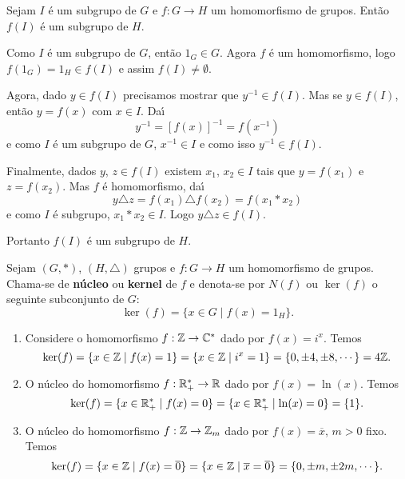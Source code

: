 \begin{proposicao}
    Sejam $I$ \'e um subgrupo de $G$ e $f : G \to H$ um homomorfismo de grupos. Ent\~ao $f(I)$ \'e um subgrupo de $H$.
\end{proposicao}
\begin{prova}
    Como $I$ \'e um subgrupo de $G$, ent\~ao $1_G \in G$. Agora $f$ \'e um homomorfismo, logo $f(1_G) = 1_H \in f(I)$ e assim $f(I) \ne \emptyset$.

    Agora, dado $y \in f(I)$ precisamos mostrar que $y^{-1} \in f(I)$. Mas se $y \in f(I)$, ent\~ao $y = f(x)$ com $x \in I$. Da{\'\i}
    \[
        y^{-1} = [f(x)]^{-1} = f(x^{-1})
    \]
    e como $I$ \'e um subgrupo de $G$, $x^{-1} \in I$ e como isso $y^{-1} \in f(I)$.

    Finalmente, dados $y$, $z \in f(I)$ existem $x_1$, $x_2 \in I$ tais que $y = f(x_1)$ e $z = f(x_2)$. Mas $f$ \'e homomorfismo, da{\'\i}
    \[
        y\triangle z = f(x_1)\triangle f(x_2) = f(x_1*x_2)
    \]
    e como $I$ \'e subgrupo, $x_1*x_2 \in I$. Logo $y\triangle z \in f(I)$.

    Portanto $f(I)$ \'e um subgrupo de $H$.
\end{prova}

\begin{definicao}
    Sejam $(G, *)$, $(H, \triangle)$ grupos e $f : G \to H$ um homomorfismo de grupos. Chama-se de \textbf{n\'ucleo} ou \textbf{kernel} de $f$ e denota-se por $N(f)$ ou $\ker(f)$ o seguinte subconjunto de $G$:
    \[
        \ker(f) = \{x \in G \mid f(x) = 1_H\}.
    \]
\end{definicao}

\begin{exemplos}
    \begin{enumerate}[label={\roman*})]
        \item Considere o homomorfismo $f : \mathbb{Z} \to \mathbb{C}^*$ dado por $f(x) = i^x$. Temos
        \[
            \ker(f) = \{x \in \mathbb{Z} \mid f(x) = 1\} = \{x \in \mathbb{Z} \mid i^x = 1\} = \{0, \pm 4, \pm 8, \cdots\} = 4\mathbb{Z}.
        \]

        \item O n\'ucleo do homomorfismo $f : \mathbb{R}^*_+ \to \mathbb{R}$ dado por $f(x) = \ln(x)$. Temos
        \[
            \ker(f) = \{x \in \mathbb{R}^*_+ \mid f(x) = 0\} = \{x \in \mathbb{R}^*_+ \mid \ln(x) = 0\} = \{1\}.
        \]

        \item O n\'ucleo do homomorfismo $f : \mathbb{Z} \to \mathbb{Z}_m$ dado por $f(x) = \overline{x}$, $m > 0$ fixo. Temos
        \[
            \ker(f) = \{x \in \mathbb{Z} \mid f(x) = \overline{0}\} = \{x \in \mathbb{Z} \mid \overline{x} = \overline{0}\} = \{0, \pm m, \pm 2m, \cdots\}.
        \]
    \end{enumerate}
\end{exemplos}

